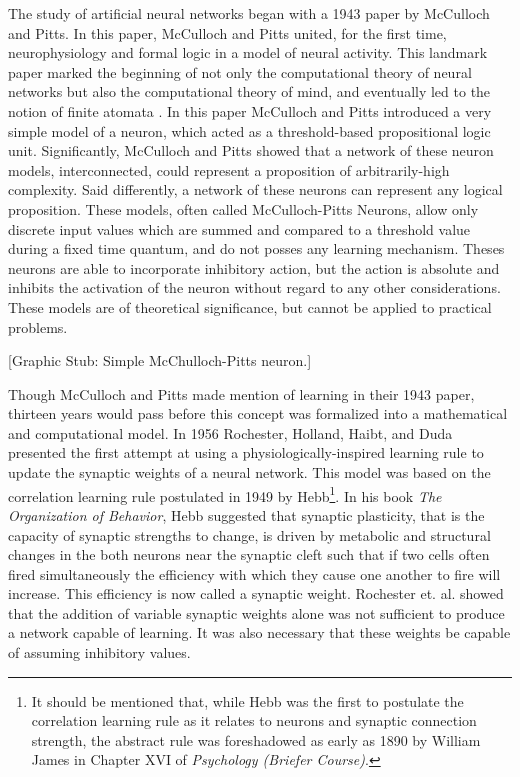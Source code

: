 \documentclass[11pt]{afthesis}
\begin{document}
	
	The study of artificial neural networks began with a 1943 paper \cite{mcculloch1988} by McCulloch and Pitts. In this paper, McCulloch and Pitts united, for the first time, neurophysiology and formal logic in a model of neural activity. This landmark paper marked the beginning of not only the computational theory of neural networks but also the computational theory of mind, and eventually led to the notion of finite atomata \cite{piccinini2006}. In this paper McCulloch and Pitts introduced a very simple model of a neuron, which acted as a threshold-based propositional logic unit. Significantly, McCulloch and Pitts showed that a network of these neuron models, interconnected, could represent a proposition of arbitrarily-high complexity. Said differently, a network of these neurons can represent any logical proposition. These models, often called McCulloch-Pitts Neurons, allow only discrete input values which are summed and compared to a threshold value during a fixed time quantum, and do not posses any learning mechanism. Theses neurons are able to incorporate inhibitory action, but the action is absolute and inhibits the activation of the neuron without regard to any other considerations. These models are of theoretical significance, but cannot be applied to practical problems.
	
	[Graphic Stub: Simple McChulloch-Pitts neuron.]
	
	Though McCulloch and Pitts made mention of learning in their 1943 paper, thirteen years would pass before this concept was formalized into a mathematical and computational model. In 1956 Rochester, Holland, Haibt, and Duda \cite{rochester1956} presented the first attempt at using a physiologically-inspired learning rule to update the synaptic weights of a neural network. This model was based on the correlation learning rule postulated in 1949 by Hebb\footnote{It should be mentioned that, while Hebb was the first to postulate the correlation learning rule as it relates to neurons and synaptic connection strength, the abstract rule was foreshadowed as early as 1890 by William James \cite{james1890principles} in Chapter XVI of \textit{Psychology (Briefer Course)}.}. In his book \textit{The Organization of Behavior}, Hebb suggested that synaptic plasticity, that is the capacity of synaptic strengths to change, is driven by metabolic and structural changes in the both neurons near the synaptic cleft \cite{hebb1967} such that if two cells often fired simultaneously the efficiency with which they cause one another to fire will increase. This efficiency is now called a synaptic weight. Rochester et. al. showed that the addition of variable synaptic weights alone was not sufficient to produce a network capable of learning. It was also necessary that these weights be capable of assuming inhibitory values.
	
\end{document}
